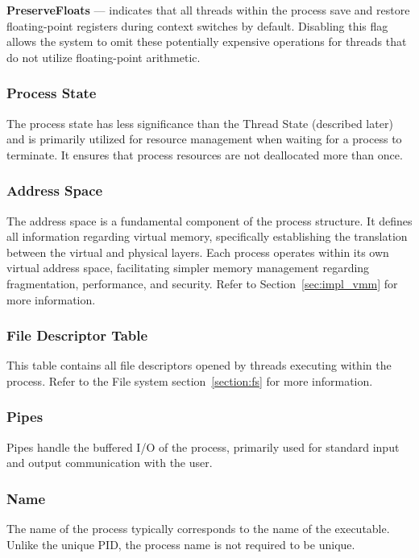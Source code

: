 \documentclass[a4paper,10pt,twoside]{report}
\theoremstyle{definition}
\begin{document}
\textbf{PreserveFloats} --- indicates that all threads within the process save and restore floating-point registers during context switches by default. Disabling this flag allows the system to omit these potentially expensive operations for threads that do not utilize floating-point arithmetic.

\subsubsection{Process State}

The process state has less significance than the Thread State (described later) and is primarily utilized for resource management when waiting for a process to terminate. It ensures that process resources are not deallocated more than once.

\subsubsection{Address Space}

The address space is a fundamental component of the process structure. It defines all information regarding virtual memory, specifically establishing the translation between the virtual and physical layers. Each process operates within its own virtual address space, facilitating simpler memory management regarding fragmentation, performance, and security. Refer to Section~\ref{sec:impl_vmm} for more information.

\subsubsection{File Descriptor Table}

This table contains all file descriptors opened by threads executing within the process. Refer to the File system section~\ref{section:fs} for more information.

\subsubsection{Pipes}

Pipes handle the buffered I/O of the process, primarily used for standard input and output communication with the user.

\subsubsection{Name}

The name of the process typically corresponds to the name of the executable. Unlike the unique PID, the process name is not required to be unique.
\end{document}
